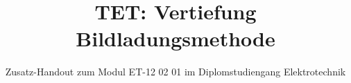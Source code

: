 

\title[Vertiefung Bildladungsmethode]{TET: Vertiefung Bildladungsmethode}

\subtitle{Zusatz-Handout zum Modul ET-12 02 01 im Diplomstudiengang Elektrotechnik}

% 
% 

\maketitle

% 
% 


